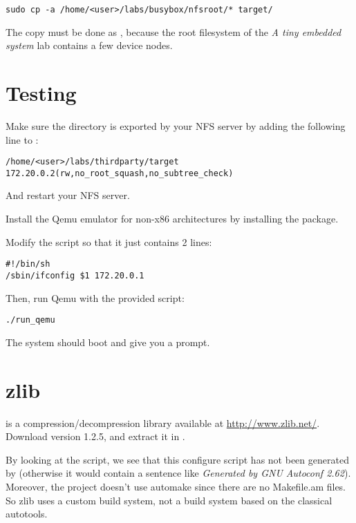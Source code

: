 \begin{verbatim}
sudo cp -a /home/<user>/labs/busybox/nfsroot/* target/
\end{verbatim}

The copy must be done as , because the root filesystem of
the {\em A tiny embedded system} lab contains a few device nodes.

\section{Testing}

Make sure the  directory is exported by your NFS server
by adding the following line to :

\scriptsize
\begin{verbatim}
/home/<user>/labs/thirdparty/target 172.20.0.2(rw,no_root_squash,no_subtree_check)
\end{verbatim}
\normalsize

And restart your NFS server.

Install the Qemu emulator for non-x86 architectures by installing the
 package.

Modify the  script so that it just contains 2 lines:
\begin{verbatim}
#!/bin/sh
/sbin/ifconfig $1 172.20.0.1
\end{verbatim}

Then, run Qemu with the provided script:

\begin{verbatim}
./run_qemu
\end{verbatim}

The system should boot and give you a prompt.

\section{zlib}

 is a compression/decompression library available at
\url{http://www.zlib.net/}. Download version 1.2.5, and extract it in
.

By looking at the  script, we see that this configure
script has not been generated by  (otherwise it would
contain a sentence like {\em Generated by GNU Autoconf
  2.62}). Moreover, the project doesn't use automake since there are
no Makefile.am files. So zlib uses a custom build system, not a build
system based on the classical autotools.

